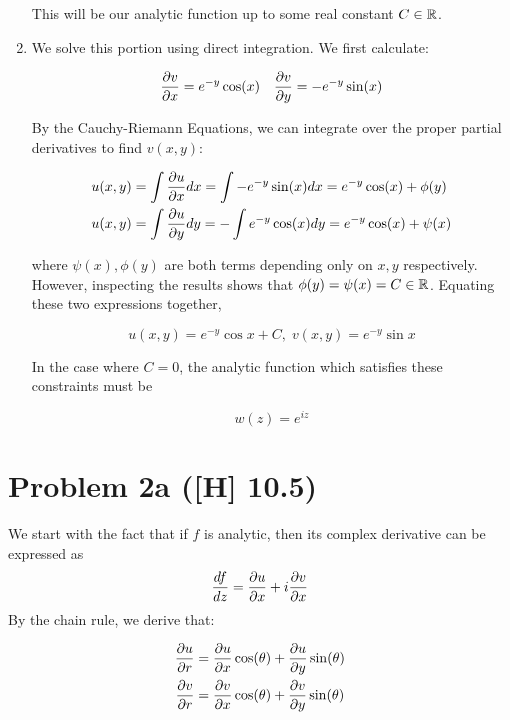 \documentclass[12pt]{article}%
\begin{document}
\begin{enumerate}
    This will be our analytic function up to some real constant $C \in {\mathbb{R}}$.

    \item We solve this portion using direct integration. We first calculate:

    \[ \frac{\partial{v}}{\partial{x}} = e^{-y}\cos(x) \quad \frac{\partial{v}}{\partial{y}} = -e^{-y}\sin(x) \]

    By the Cauchy-Riemann Equations, we can integrate over the proper partial derivatives to find $v(x,y)$:

    \begin{align*}
      u(x,y) & = \int \frac{\partial{u}}{\partial{x}} dx = \int -e^{-y}\sin(x) dx = e^{-y}\cos(x) + \phi(y) \\
      u(x,y) & = \int \frac{\partial{u}}{\partial{y}} dy = - \int e^{-y}\cos(x) dy = e^{-y}\cos(x) + \psi(x)
    \end{align*}

    where $\psi(x), \phi(y)$ are both terms depending only on $x,y$ respectively. However, inspecting the results shows that $\phi(y) = \psi(x) = C\in {\mathbb{R}}$. Equating these two expressions together,

    \[ u(x,y) =  e^{-y}\cos{x} + C, \; v(x,y) = e^{-y}\sin{x}\]

    In the case where $C=0$, the analytic function which satisfies these constraints must be

    \[ w(z) = e^{iz} \]
\end{enumerate}

\section{Problem 2a ([H] 10.5)}

We start with the fact that if $f$ is analytic, then its complex derivative can be expressed as \[\frac{d{f}}{d{z}} = \frac{\partial{u}}{\partial{x}} + i\frac{\partial{v}}{\partial{x}}\]
%
By the chain rule, we derive that:

\begin{align}
  \frac{\partial{u}}{\partial{r}} & = \frac{\partial{u}}{\partial{x}} \cos(\theta) + \frac{\partial{u}}{\partial{y}}\sin(\theta) \label{eq:urRel}\\
  \frac{\partial{v}}{\partial{r}} & = \frac{\partial{v}}{\partial{x}} \cos(\theta) + \frac{\partial{v}}{\partial{y}}\sin(\theta) \label{eq:uvRel}
\end{align}
\end{document}
